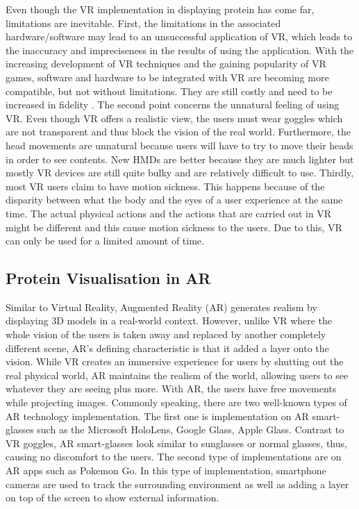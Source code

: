 Even though the VR implementation in displaying protein has come far, limitations are inevitable.
First, the limitations in the associated hardware/software may lead to an unsuccessful application of VR, which leads to the inaccuracy and impreciseness in the results of using the application. With the increasing development of VR techniques and the gaining popularity of VR games, software and hardware to be integrated with VR are becoming more compatible, but not without limitations. They are still costly and need to be increased in fidelity \parencite{liu_using_2018}.
The second point concerns the unnatural feeling of using VR. Even though VR offers a realistic view, the users must wear goggles which are not transparent and thus block the vision of the real world. Furthermore, the head movements are unnatural because users will have to try to move their heads in order to see contents. New HMDs are better because they are much lighter but mostly VR devices are still quite bulky and are relatively difficult to use. 
Thirdly, most VR users claim to have motion sickness. This happens because of the disparity between what the body and the eyes of a user experience at the same time. The actual physical actions and the actions that are carried out in VR might be different and this cause motion sickness to the users. Due to this, VR can only be used for a limited amount of time.


\subsection{Protein Visualisation in AR}

Similar to Virtual Reality, Augmented Reality (AR) generates realism by displaying 3D models in a real-world context. However, unlike VR where the whole vision of the users is taken away and replaced by another completely different scene, AR’s defining characteristic is that it added a layer onto the vision. While VR creates an immersive experience for users by shutting out the real physical world, AR maintains the realism of the world, allowing users to see whatever they are seeing plus more. With AR, the users have free movements while projecting images. Commonly speaking, there are two well-known types of AR technology implementation. The first one is implementation on AR smart-glasses such as the Microsoft HoloLens, Google Glass, Apple Glass. Contrast to VR goggles, AR smart-glasses look similar to sunglasses or normal glasses, thus, causing no discomfort to the users. 
The second type of implementations are on AR apps such as Pokemon Go. In this type of implementation, smartphone cameras are used to track the surrounding environment as well as adding a layer on top of the screen to show external information.

